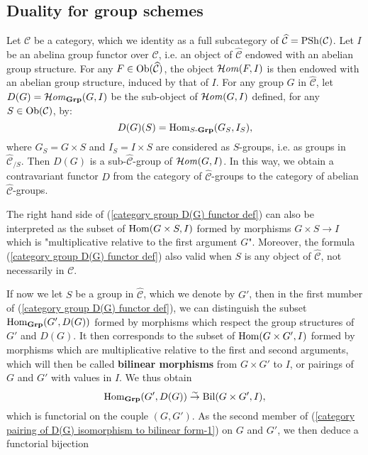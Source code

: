 \subsection{Duality for group schemes}\label{scheme group duality}
Let $\mathcal{C}$ be a category, which we identity as a full subcategory of $\widehat{\mathcal{C}}=\mathrm{PSh}(\mathcal{C})$. Let $I$ be an abelina group functor over $\mathcal{C}$, i.e. an object of $\widehat{\mathcal{C}}$ endowed with an abelian group structure. For any $F\in\mathrm{Ob}(\widehat{\mathcal{C}})$, the object $\operatorname{\mathcal{H}\hspace*{-0.4pt}\textit{om}\hspace{0.5pt}}(F,I)$ is then endowed with an abelian group structure, induced by that of $I$. For any group $G$ in $\widehat{\mathcal{C}}$, let $D(G)=\operatorname{\mathcal{H}\hspace*{-0.4pt}\textit{om}\hspace{0.5pt}}_{\mathbf{Grp}}(G,I)$ be the sub-object of $\operatorname{\mathcal{H}\hspace*{-0.4pt}\textit{om}\hspace{0.5pt}}(G,I)$ defined, for any $S\in\mathrm{Ob}(\mathcal{C})$, by:
\begin{equation}\label{category group D(G) functor def}
D(G)(S)=\mathrm{Hom}_{S\textup{-}\mathbf{Grp}}(G_S,I_S),
\end{equation}
where $G_S=G\times S$ and $I_S=I\times S$ are considered as $S$-groups, i.e. as groups in $\widehat{\mathcal{C}}_{/S}$. Then $D(G)$ is a sub-$\widehat{\mathcal{C}}$-group of $\operatorname{\mathcal{H}\hspace*{-0.4pt}\textit{om}\hspace{0.5pt}}(G,I)$. In this way, we obtain a contravariant functor $D$ from the category of $\widehat{\mathcal{C}}$-groups to the category of abelian $\widehat{\mathcal{C}}$-groups.\par
The right hand side of (\ref{category group D(G) functor def}) can also be interpreted as the subset of $\mathrm{Hom}(G\times S,I)$ formed by morphisms $G\times S\to I$ which is "multiplicative relative to the first argument $G$". Moreover, the formula (\ref{category group D(G) functor def}) also valid when $S$ is any object of $\widehat{\mathcal{C}}$, not necessarily in $\mathcal{C}$.\par
If now we let $S$ be a group in $\widehat{\mathcal{C}}$, which we denote by $G'$, then in the first mumber of (\ref{category group D(G) functor def}), we can distinguish the subset $\mathrm{Hom}_{\mathbf{Grp}}(G',D(G))$ formed by morphisms which respect the group structures of $G'$ and $D(G)$. It then corresponds to the subset of $\mathrm{Hom}(G\times G',I)$ formed by morphisms which are multiplicative relative to the first and second arguments, which will then be called \textbf{bilinear morphisms} from $G\times G'$ to $I$, or pairings of $G$ and $G'$ with values in $I$. We thus obtain
\begin{equation}\label{category pairing of D(G) isomorphism to bilinear form-1}
\mathrm{Hom}_{\mathbf{Grp}}(G',D(G))\stackrel{\sim}{\to}\mathrm{Bil}(G\times G',I),
\end{equation}
which is functorial on the couple $(G,G')$. As the second member of (\ref{category pairing of D(G) isomorphism to bilinear form-1}) on $G$ and $G'$, we then deduce a functorial bijection
